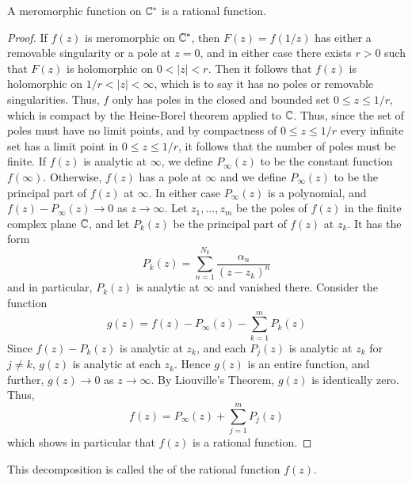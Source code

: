 \begin{theorem}
    A meromorphic function on $\mathbb C^*$ is a rational function.
\end{theorem}
\begin{proof}
    If $f(z)$ is meromorphic on $\mathbb C^*$, then $F(z) = f(1/z)$ has either a removable singularity or a pole at $z = 0$, and in either case there exists $r > 0$ such that $F(z)$ is holomorphic on $0 < |z| < r$. Then it follows that $f(z)$ is holomorphic on $1/r < |z| < \infty$, which is to say it has no poles or removable singularities. Thus, $f$ only has poles in the closed and bounded set $0\leq z \leq 1/r$, which is compact by the Heine-Borel theorem applied to $\mathbb C$. Thus, since the set of poles must have no limit points, and by compactness of $0\leq z \leq 1/r$ every infinite set has a limit point in $0 \leq z \leq 1/r$, it follows that the number of poles must be finite. If $f(z)$ is analytic at $\infty$, we define $P_{\infty}(z)$ to be the constant function $f(\infty)$. Otherwise, $f(z)$ has a pole at $\infty$ and we define $P_{\infty}(z)$ to be the principal part of $f(z)$ at $\infty$. In either case $P_{\infty}(z)$ is a polynomial, and $f(z) - P_{\infty}(z)\rightarrow 0$ as $z\rightarrow \infty$. Let $z_1,...,z_m$ be the poles of $f(z)$ in the finite complex plane $\mathbb C$, and let $P_k(z)$ be the principal part of $f(z)$ at $z_k$. It has the form \begin{equation*}
        P_k(z) = \sum_{n=1}^{N_k}\frac{\alpha_n}{(z-z_k)^n}
    \end{equation*}
    and in particular, $P_k(z)$ is analytic at $\infty$ and vanished there. Consider the function \begin{equation*}
        g(z) = f(z) - P_{\infty}(z) - \sum_{k=1}^mP_k(z)
    \end{equation*}
    Since $f(z)-P_k(z)$ is analytic at $z_k$, and each $P_j(z)$ is analytic at $z_k$ for $j \neq k$, $g(z)$ is analytic at each $z_k$. Hence $g(z)$ is an entire function, and further, $g(z)\rightarrow 0$ as $z\rightarrow \infty$. By Liouville's Theorem, $g(z)$ is identically zero. Thus, \begin{equation*}
        f(z) = P_{\infty}(z) + \sum_{j=1}^mP_j(z)
    \end{equation*}
    which shows in particular that $f(z)$ is a rational function.
\end{proof}

This decomposition is called the  of the rational function $f(z)$. 



